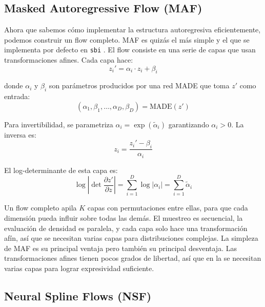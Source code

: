 \subsection{Masked Autoregressive Flow (MAF)}

Ahora que sabemos cómo implementar la estructura autoregresiva eficientemente, podemos construir un flow completo. MAF \cite{papamakarios2018maf} es quizás el más simple y el que se implementa por defecto en \texttt{sbi} \cite{tejero2020}. El flow consiste en una serie de capas que usan transformaciones afines. Cada capa hace:
\begin{equation}
z_i' = \alpha_i \cdot z_i + \beta_i
\end{equation}

donde $\alpha_i$ y $\beta_i$ son parámetros producidos por una red MADE que toma $z'$ como entrada:
\begin{equation}
(\alpha_1, \beta_1, \dots, \alpha_D, \beta_D) = \text{MADE}(z')
\end{equation}

Para invertibilidad, se parametriza $\alpha_i = \exp(\tilde{\alpha}_i)$ garantizando $\alpha_i > 0$. La inversa es:
\begin{equation}
z_i = \frac{z_i' - \beta_i}{\alpha_i}
\end{equation}

El log-determinante de esta capa es:
\begin{equation}
\log \left| \det \frac{\partial z'}{\partial z} \right| = \sum_{i=1}^{D} \log |\alpha_i| = \sum_{i=1}^{D} \tilde{\alpha}_i
\end{equation}

Un flow completo apila $K$ capas con permutaciones entre ellas, para que cada dimensión pueda influir sobre todas las demás. El muestreo es secuencial, la evaluación de densidad es paralela, y cada capa solo hace una transformación afín, así que se necesitan varias capas para distribuciones complejas. La simpleza de MAF es su principal ventaja pero también su principal desventaja. Las transformaciones afines tienen pocos grados de libertad, así que en la se necesitan varias capas para lograr expresividad suficiente. 

\subsection{Neural Spline Flows (NSF)}

